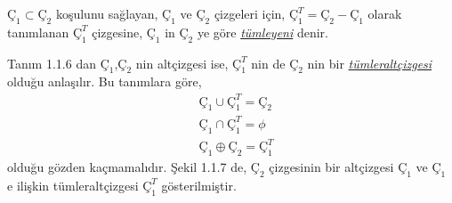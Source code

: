 \documentclass[11pt]{amsbook}
\begin{document}

\begin{definition}
$Ç_1 \subset Ç_2$ koşulunu sağlayan, $Ç_1$ ve $Ç_2$ çizgeleri için, $Ç_1^T = Ç_2 - Ç_1$ olarak tanımlanan $Ç_1^T$ çizgesine, $Ç_1$ in $Ç_2$ ye göre \underline{\itshape{tümleyeni}} denir.
\end{definition}

Tanım 1.1.6 dan $Ç_1$,$Ç_2$ nin altçizgesi ise, $Ç_1^T$ nin de $Ç_2$ nin bir \underline{\itshape{tümleraltçizgesi}} olduğu anlaşılır. Bu tanımlara göre,
\begin{align*}
    &Ç_1 
        \cup 
            Ç_1^T = 
            Ç_2 \\
    &Ç_1 
        \cap 
            Ç_1^T = 
            \phi \\
    &Ç_1 
        \oplus 
            Ç_2 = 
            Ç_1^T
\end{align*}
olduğu gözden kaçmamalıdır. Şekil 1.1.7 de, $Ç_2$ çizgesinin bir altçizgesi $Ç_1$ ve $Ç_1$ e ilişkin tümleraltçizgesi $Ç_1^T$ gösterilmiştir.
\end{document}
